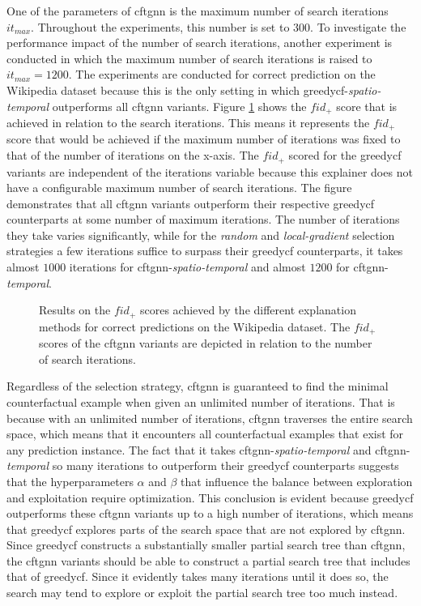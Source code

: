 One of the parameters of \gls{cftgnn} is the maximum number of search iterations $it_{max}$. Throughout the experiments, this number is set to $300$. To investigate the performance impact of the number of search iterations, another experiment is conducted in which the maximum number of search iterations is raised to $it_{max}=1200$. The experiments are conducted for correct prediction on the Wikipedia dataset because this is the only setting in which \gls{greedycf}-\textit{spatio-temporal} outperforms all \gls{cftgnn} variants. Figure \ref{f_fid_iteration} shows the $fid_+$ score that is achieved in relation to the search iterations. This means it represents the $fid_+$ score that would be achieved if the maximum number of iterations was fixed to that of the number of iterations on the x-axis. The $fid_+$ scored for the \gls{greedycf} variants are independent of the iterations variable because this explainer does not have a configurable maximum number of search iterations. 
The figure demonstrates that all \gls{cftgnn} variants outperform their respective \gls{greedycf} counterparts at some number of maximum iterations. The number of iterations they take varies significantly, while for the \textit{random} and \textit{local-gradient} selection strategies a few iterations suffice to surpass their \gls{greedycf} counterparts, it takes almost $1000$ iterations for \gls{cftgnn}-\textit{spatio-temporal} and almost $1200$ for \gls{cftgnn}-\textit{temporal}. 

\begin{figure}[ht]
    \centering
    
    \caption{Results on the $fid_+$ scores achieved by the different explanation methods for correct predictions on the Wikipedia dataset. The $fid_+$ scores of the \gls{cftgnn} variants are depicted in relation to the number of search iterations.}
    \label{f_fid_iteration}
\end{figure}

Regardless of the selection strategy, \gls{cftgnn} is guaranteed to find the minimal counterfactual example when given an unlimited number of iterations. That is because with an unlimited number of iterations, \gls{cftgnn} traverses the entire search space, which means that it encounters all counterfactual examples that exist for any prediction instance. The fact that it takes \gls{cftgnn}-\textit{spatio-temporal} and \gls{cftgnn}-\textit{temporal} so many iterations to outperform their \gls{greedycf} counterparts suggests that the hyperparameters $\alpha$ and $\beta$ that influence the balance between exploration and exploitation require optimization. This conclusion is evident because \gls{greedycf} outperforms these \gls{cftgnn} variants up to a high number of iterations, which means that \gls{greedycf} explores parts of the search space that are not explored by \gls{cftgnn}. Since \gls{greedycf} constructs a substantially smaller partial search tree than \gls{cftgnn}, the \gls{cftgnn} variants should be able to construct a partial search tree that includes that of \gls{greedycf}. Since it evidently takes many iterations until it does so, the search may tend to explore or exploit the partial search tree too much instead.



